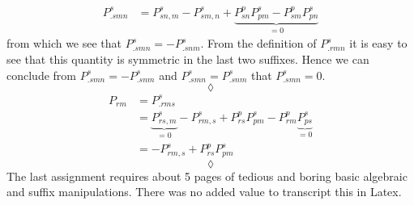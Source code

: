 \begin{align}
P^s_{.smn}&=P^s_{sn,m}-P^s_{sm,n}+\underbrace{P^p_{sn}P^s_{pm}-P^p_{sm}P^s_{pn} }_{=0}
\end{align}
from which we see that $P^s_{.smn}=-P^s_{.snm}$. From the definition of $P^s_{.rmn}$ it is easy to see that this quantity is symmetric in the last two suffixes.
Hence we can conclude from $P^s_{.smn}=-P^s_{.snm}$ and $P^s_{.smn}=P^s_{.snm}$ that $P^s_{.smn}=0$.
$$\lozenge$$
\begin{align*}
P_{rm}&=P^s_{.rms}\\
&=\underbrace{P^s_{rs,m}}_{=0}-P^s_{rm,s}+P^p_{rs}P^s_{pm}-P^p_{rm}\underbrace{P^s_{ps} }_{=0}\\
&=-P^s_{rm,s}+P^p_{rs}P^s_{pm}
\end{align*}
$$\lozenge$$
The last assignment requires about 5 pages of tedious and boring basic algebraic and suffix manipulations. There was no added value to transcript this in Latex.
